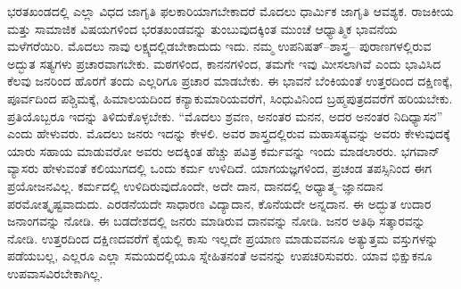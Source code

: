 ಭರತಖಂಡದಲ್ಲಿ ಎಲ್ಲಾ ವಿಧದ ಜಾಗೃತಿ ಫಲಕಾರಿಯಾಗಬೇಕಾದರೆ ಮೊದಲು ಧಾರ್ಮಿಕ ಜಾಗೃತಿ ಆವಶ್ಯಕ. ರಾಜಕೀಯ ಮತ್ತು ಸಾಮಾಜಿಕ ವಿಷಯಗಳಿಂದ ಭರತಖಂಡವನ್ನು ತುಂಬುವುದಕ್ಕಿಂತ ಮುಂಚೆ ಆಧ್ಯಾತ್ಮಿಕ ಭಾವನೆಯ ಮಳೆಗರೆಯಿರಿ. ಮೊದಲು ನಾವು ಲಕ್ಷ್ಯದಲ್ಲಿಡಬೇಕಾದುದು ಇದು. ನಮ್ಮ ಉಪನಿಷತ್​–ಶಾಸ್ತ್ರ– ಪುರಾಣಗಳಲ್ಲಿರುವ ಅದ್ಭುತ ಸತ್ಯಗಳು ಪ್ರಚಾರವಾಗಬೇಕು. ಮಠಗಳಿಂದ, ಕಾನನಗಳಿಂದ, ತಮಗೇ ಇವು ಮೀಸಲಾಗಿವೆ ಎಂದು ಭಾವಿಸಿದ ಕೆಲವು ಜನರಿಂದ ಹೊರಗೆ ತಂದು ಎಲ್ಲರಿಗೂ ಪ್ರಚಾರ ಮಾಡಬೇಕು. ಈ ಭಾವನೆ ಬೆಂಕಿಯಂತೆ ಉತ್ತರದಿಂದ ದಕ್ಷಿಣಕ್ಕೆ, ಪೂರ್ವದಿಂದ ಪಶ್ಚಿಮಕ್ಕೆ, ಹಿಮಾಲಯದಿಂದ ಕನ್ಯಾಕುಮಾರಿಯವರೆಗೆ, ಸಿಂಧುವಿನಿಂದ ಬ್ರಹ್ಮಪುತ್ರದವರೆಗೆ ಹರಿಯಬೇಕು. ಪ್ರತಿಯೊಬ್ಬರೂ ಇದನ್ನು ತಿಳಿದುಕೊಳ್ಳಬೇಕು. “ಮೊದಲು ಶ್ರವಣ, ಅನಂತರ ಮನನ, ಅದರ ಅನಂತರ ನಿದಿಧ್ಯಾಸನ” ಎಂದು ಹೇಳುವರು. ಮೊದಲು ಜನರು ಇದನ್ನು ಕೇಳಲಿ. ಅವರ ಶಾಸ್ತ್ರದಲ್ಲಿರುವ ಮಹಾಸತ್ಯವನ್ನು ಅವರು ಕೇಳುವುದಕ್ಕೆ ಯಾರು ಸಹಾಯ ಮಾಡುವರೋ ಅವರು ಅದಕ್ಕಿಂತ ಹೆಚ್ಚು ಪವಿತ್ರ ಕರ್ಮವನ್ನು ಇಂದು ಮಾಡಲಾರರು. ಭಗವಾನ್​ ವ್ಯಾಸರು ಹೇಳುವಂತೆ ಕಲಿಯುಗದಲ್ಲಿ ಒಂದು ಕರ್ಮ ಉಳಿದಿದೆ. ಯಾಗಯಜ್ಞಗಳಿಂದ, ಪ್ರಚಂಡ ತಪಸ್ಸಿನಿಂದ ಈಗ ಪ್ರಯೋಜನವಿಲ್ಲ. ಕರ್ಮದಲ್ಲಿ ಉಳಿದಿರುವುದೊಂದೇ, ಅದೇ ದಾನ, ದಾನದಲ್ಲಿ ಅಧ್ಯಾತ್ಮ–ಜ್ಞಾನದಾನ ಪರಮೋತ್ಕೃಷ್ಟವಾದುದು. ಎರಡನೆಯದೇ ಸಾಧಾರಣ ವಿದ್ಯಾದಾನ, ಕೊನೆಯದೇ ಅನ್ನದಾನ. ಈ ಅದ್ಭುತ ಉದಾರ ಜನಾಂಗವನ್ನು ನೋಡಿ. ಈ ಬಡದೇಶದಲ್ಲಿ ಜನರು ಮಾಡಿರುವ ದಾನವನ್ನು ನೋಡಿ. ಜನರ ಅತಿಥಿ ಸತ್ಕಾರವನ್ನು ನೋಡಿ. ಉತ್ತರದಿಂದ ದಕ್ಷಿಣದವರೆಗೆ ಕೈಯಲ್ಲಿ ಕಾಸು ಇಲ್ಲದೇ ಪ್ರಯಾಣ ಮಾಡುವವನೂ ಅತ್ಯುತ್ತಮ ವಸ್ತುಗಳನ್ನು ಪಡೆಯಬಲ್ಲ, ಎಲ್ಲರೂ ಎಲ್ಲಾ ಸಮಯದಲ್ಲಿಯೂ ಸ್ನೇಹಿತನಂತೆ ಅವನನ್ನು ಉಪಚರಿಸುವರು. ಯಾವ ಭಿಕ್ಷುಕನೂ ಉಪವಾಸವಿರಬೇಕಾಗಿಲ್ಲ.

